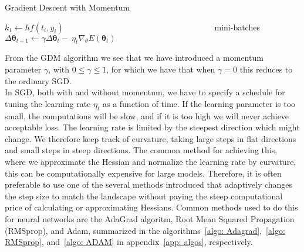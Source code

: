 \documentclass[english,notitlepage,reprint,nofootinbib]{revtex4-2}  %
\begin{document}
\begin{algorithm}[H]
    \caption{Gradient Descent with Momentum}\label{algo:GDM}
    \begin{algorithmic}
        \State $k_1 \leftarrow hf(t_i,y_i)$  
         
        \State $\:\:\:\:\:\:\:\:\:\:\:\:\:\:\:\:\:\:\:\:\:\:\:\:\:\:\:\:\:\:\:\:\:\:\:\:\:\:\:\:\:\:\:\:\:\:\:\:\:\:\:\:\:\:\:\:\:\:\:\:\:\:\:\:\:\:\:\:\:\:\:\:\:\:\:\:\:\:\:\:$ mini-batches
        \State $\Delta \boldsymbol{\theta}_{t+1} \leftarrow 
                \gamma \Delta \boldsymbol{\theta}_t -\ \eta_{t}\nabla_\theta E(\boldsymbol{\theta}_t)$ 
        \EndWhile
    \end{algorithmic}
\end{algorithm}
From the GDM algorithm we see that we have introduced a momentum parameter $\gamma$, with $0\leq\gamma\leq 1$, for which we have that when $\gamma = 0$ this reduces to the ordinary SGD. 
\vspace{3mm}
\\ 
In SGD, both with and without momentum, we have to specify a schedule for tuning the learning rate $\eta_t$ as a function of time. 
If the learning parameter is too small, the computations will be slow, and if it is too high we will never achieve acceptable loss. 
The learning rate is limited by the steepest direction which might change. We therefore keep track of curvature, taking large steps in flat directions and small steps in steep directions. 
The common method for achieving this, where we approximate the Hessian and normalize the learning rate by curvature, this can be computationally expensive for large models. Therefore, it is often preferable to use one of the several methods introduced that adaptively changes the step size to match the landscape without paying the steep computational price of calculating or approximating Hessians. Common methods used to do this for neural networks are the AdaGrad algoritm, Root Mean Squared Propagation (RMSprop), and Adam, summarized in the algorithms~\ref{algo: Adagrad},~\ref{algo: RMSprop}, and~\ref{algo: ADAM} in appendix~\ref{app: algos}, respectively. 
\end{document}
